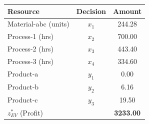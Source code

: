 \documentclass[7pt]{article}
\begin{document}
\begin{minipage}[t]{0.4\textwidth}
    \vspace{5em}
    \centering
    \small
    \begin{tabular}{l|c|c}
        \toprule
        \textbf{Resource}    & \textbf{Decision} & \textbf{Amount}  \\
        \midrule
        Material-abc (units) & $x_1$             & 244.28           \\
        Process-1 (hrs)      & $x_2$             & 700.00           \\
        Process-2 (hrs)      & $x_3$             & 443.40           \\
        Process-3 (hrs)      & $x_4$             & 334.60           \\
        Product-a            & $y_1$             & 0.00             \\
        Product-b            & $y_2$             & 6.16             \\
        Product-c            & $y_3$             & 19.50            \\
        \midrule
        $z_{EV}^*$ (Profit)  &                   & \textbf{3233.00} \\
        \bottomrule
    \end{tabular}
\end{minipage}
\end{document}
